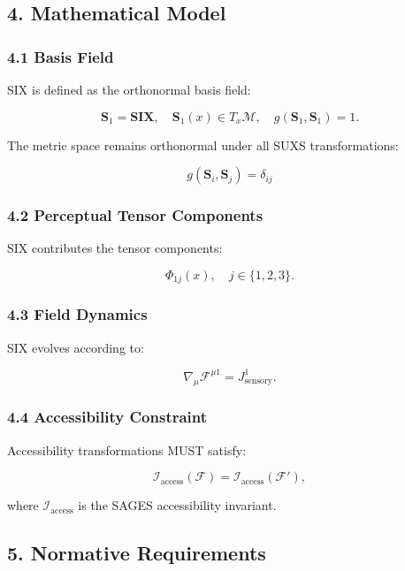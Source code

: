 \subsection{4. Mathematical Model}\label{mathematical-model}

\subsubsection{4.1 Basis Field}\label{basis-field}

SIX is defined as the orthonormal basis field:

\[
\mathbf{S}_1 = \mathbf{SIX},\quad \mathbf{S}_1(x) \in T_x\mathcal{M}, \quad g(\mathbf{S}_1, \mathbf{S}_1) = 1.
\]

The metric space remains orthonormal under all SUXS transformations:

\[
g(\mathbf{S}_i,\mathbf{S}_j)=\delta_{ij}
\]

\subsubsection{4.2 Perceptual Tensor Components}\label{perceptual-tensor-components}

SIX contributes the tensor components:

\[
\Phi_{1j}(x), \quad j \in \{1,2,3\}.
\]

\subsubsection{4.3 Field Dynamics}\label{field-dynamics}

SIX evolves according to:

\[
\nabla_{\mu} \mathcal{F}^{\mu 1} = J^{1}_{\mathrm{sensory}}.
\]

\subsubsection{4.4 Accessibility Constraint}\label{accessibility-constraint}

Accessibility transformations MUST satisfy:

\[
\mathcal{I}_{\mathrm{access}}(\mathcal{F}) = \mathcal{I}_{\mathrm{access}}(\mathcal{F}'),
\]

where \(\mathcal{I}_{\mathrm{access}}\) is the SAGES accessibility invariant.

\subsection{5. Normative Requirements}\label{normative-requirements}

